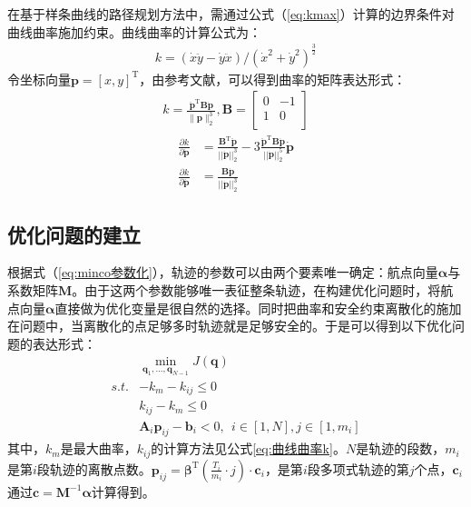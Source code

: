 \documentclass[master,academic]{ysuthesis} %
\begin{document}
		在基于样条曲线的路径规划方法中，需通过公式（\ref{eq:kmax}）计算的边界条件对曲线曲率施加约束。曲线曲率的计算公式为：
		\begin{equation}
			\begin{aligned}
				k=( \dot{x}\ddot{y}-\dot{y}\ddot{x} ) /( \dot{x}^2+\dot{y}^2 ) ^{\frac{3}{2}}
			\end{aligned}
		\end{equation}
		令坐标向量$\bm{p} =[x,y]^{\mathrm{T}}$，由参考文献\cite{han2023efficient}，可以得到曲率的矩阵表达形式：
		\begin{equation}
			\begin{aligned}
				k=\frac{\ddot{\bm{p}}^{\mathrm{T}}\bm{B}\dot{\bm{p}}}{\lVert \bm{p} \rVert _{2}^{3}},\bm{B}=\left[ \begin{matrix}
					0&		-1\\
					1&		0\\
				\end{matrix} \right]
			\end{aligned}
			\label{eq:曲线曲率k}
		\end{equation}
		\begin{equation}
			\begin{aligned}
				\frac{\partial k}{\partial \dot{\bm{p}}}&=\frac{\bm{B}^{\mathrm{T}}\ddot{\bm{p}}}{||\dot{\bm{p}}||_{2}^{3}}-3\frac{\ddot{\bm{p}}^{\mathrm{T}}\bm{B}\dot{\bm{p}}}{||\dot{\bm{p}}||_{2}^{5}}\dot{\bm{p}}\\
				\frac{\partial k}{\partial \ddot{\bm{p}}}&=\frac{\bm{B}\dot{\bm{p}}}{||\dot{\bm{p}}||_{2}^{3}}
			\end{aligned}
		\end{equation}

		\subsection{优化问题的建立}
		根据式（\ref{eq:minco参数化}），轨迹的参数可以由两个要素唯一确定：航点向量$\bm{\alpha}$与系数矩阵$\bm{M}$。由于这两个参数能够唯一表征整条轨迹，在构建优化问题时，将航点向量$\bm{\alpha}$直接做为优化变量是很自然的选择。同时把曲率和安全约束离散化的施加在问题中，当离散化的点足够多时轨迹就是足够安全的。于是可以得到以下优化问题的表达形式：
		\begin{equation}
			\begin{aligned}
				&\min_{\bm{q}_1,...,\bm{q}_{N-1}} J( \bm{q} ) \\
				s.t.&-k_{m}-k_{ij}\le 0\\
				&k_{ij}-k_{m}\le 0 \\
				&\bm{A}_i\bm{p}_{ij}-\bm{b}_{i}<0,\ \ i\in \left[ 1,N \right] ,j\in \left[ 1,m_i \right] 
			\end{aligned}
		\end{equation}
		其中，$k_{m}$是最大曲率，$k_{ij}$的计算方法见公式\ref{eq:曲线曲率k}。$N$是轨迹的段数，$m_i$是第$i$段轨迹的离散点数。$\bm{p}_{ij}=\bm{\beta}^{\mathrm{T}}(\frac{T_i}{m_i}\cdot j)\cdot \bm{c}_i$，是第$i$段多项式轨迹的第$j$个点，$\bm{c}_i$通过$\bm{c} = \bm{M}^{-1}\bm{\alpha}$计算得到。
\end{document}

